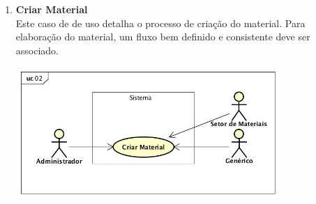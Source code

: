 \begin{enumerate}[label=\textbf{UC03}, leftmargin=2cm]
	\item \textbf{Criar Material} \\
	Este caso de de uso detalha o processo de criação do material. Para elaboração do material, um fluxo bem definido e consistente deve ser associado.  \\
	\begin{minipage}[c]{10cm}
	    \includegraphics[width=10cm]{Imagens/UC_CriarMaterial.jpg}
		\label{fig:uc_criar_material}
	\end{minipage} \\


\end{enumerate}
